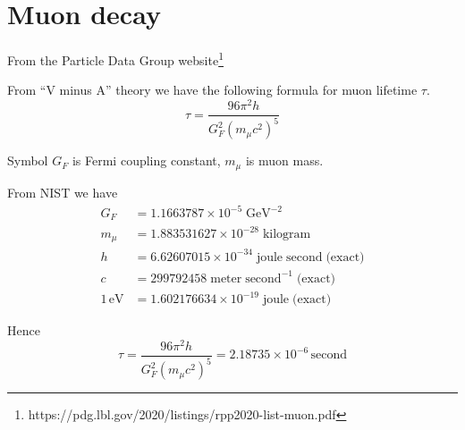 

\section*{Muon decay}
From the Particle Data Group website\footnote{https://pdg.lbl.gov/2020/listings/rpp2020-list-muon.pdf}
\begin{center}
\end{center}

From ``V minus A'' theory we have the following formula for muon lifetime $\tau$.
\begin{equation*}
\tau=\frac{96\pi^2h}{G_F^2\left(m_\mu c^2\right)^5}
\end{equation*}

Symbol $G_F$ is Fermi coupling constant, $m_\mu$ is muon mass.

\bigskip
From NIST we have
\begin{align*}
G_F&=1.1663787\times10^{-5}\;\text{GeV}^{-2}
\\
m_\mu&=1.883531627\times10^{-28}\;\text{kilogram}
\\
h&=6.62607015\times10^{-34}\;\text{joule}\;\text{second}\;\text{(exact)}
\\
c&=299792458\;\text{meter}\;\text{second}^{-1}\;\text{(exact)}
\\
1\,\text{eV}&=1.602176634\times10^{-19}\;\text{joule}\;\text{(exact)}
\end{align*}

Hence
\begin{equation*}
\tau=\frac{96\pi^2h}{G_F^2\left(m_\mu c^2\right)^5}
=2.18735\times10^{-6}\,\text{second}
\end{equation*}

